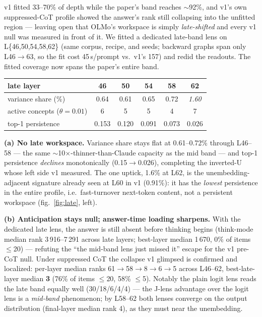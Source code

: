 \documentclass[10pt]{article}
\begin{document}
v1 fitted 33--70\% of depth while the paper's band reaches $\sim$92\%, and
v1's own suppressed-CoT profile showed the answer's rank still collapsing
into the unfitted region --- leaving open that OLMo's workspace is simply
\emph{late-shifted} and every v1 null was measured in front of it. We
fitted a dedicated late-band lens on L\{46,50,54,58,62\} (same corpus,
recipe, and seeds; backward graphs span only L46$\to$63, so the fit cost
45\,s/prompt vs.\ v1's 157) and redid the readouts. The fitted coverage now
spans the paper's entire band.

\begin{center}\small
\begin{tabular}{lccccc}
\toprule
late layer & 46 & 50 & 54 & 58 & 62 \\
\midrule
variance share (\%) & 0.64 & 0.61 & 0.65 & 0.72 & \emph{1.60} \\
active concepts ($\theta{=}0.01$) & 6 & 5 & 5 & 4 & 7 \\
top-1 persistence & 0.153 & 0.120 & 0.091 & 0.073 & 0.026 \\
\bottomrule
\end{tabular}
\end{center}

\textbf{(a) No late workspace.} Variance share stays flat at 0.61--0.72\%
through L46--58 --- the same $\sim$10$\times$-thinner-than-Claude capacity
as the mid band --- and top-1 persistence \emph{declines} monotonically
(0.15$\to$0.026), completing the inverted-U whose left side v1 measured.
The one uptick, 1.6\% at L62, is the unembedding-adjacent signature already
seen at L60 in v1 (0.91\%): it has the \emph{lowest} persistence in the
entire profile, i.e.\ fast-turnover next-token content, not a persistent
workspace (fig.~\ref{fig:late}, left).

\textbf{(b) Anticipation stays null; answer-time loading sharpens.} With
the dedicated late lens, the answer is still absent before thinking begins
(think-mode median rank 3\,916--7\,291 across late layers; best-layer
median 1\,670, 0\% of items $\le$20) --- refuting the ``the mid-band lens
just missed it'' escape for the v1 pre-CoT null. Under suppressed CoT the
collapse v1 glimpsed is confirmed and localized: per-layer median ranks
61$\to$58$\to$8$\to$6$\to$5 across L46--62, best-late-layer median
\textbf{3} (76\% of items $\le$20, 58\% $\le$5). Notably the plain logit
lens reads the late band equally well (30/18/6/4/4) --- the J-lens
advantage over the logit lens is a \emph{mid-band} phenomenon; by L58--62
both lenses converge on the output distribution (final-layer median rank
4), as they must near the unembedding.
\end{document}
